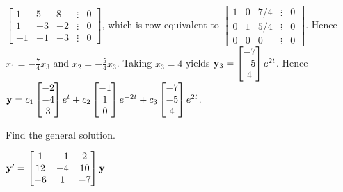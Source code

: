 \documentclass{ximera}
\begin{document}
\begin{problem}
\begin{solution}
$ \begin{bmatrix}1&5&8&\vdots&0\\1&-3
&-2&\vdots&0\\-1&-1&-3&\vdots&0
\end{bmatrix}$,
which is row equivalent to
$ \begin{bmatrix}1&0&7/4&\vdots&0\\0&1&5/4&
\vdots&0\\0&0&0&\vdots&0\end{bmatrix}$.
Hence $x_1=-\frac{7 }{4}x_3$ and $x_2=-\frac{5 }{4}x_3$.  Taking $x_3=4$
yields
${\bf y}_3= \begin{bmatrix}-7\\-5\\4
\end{bmatrix}e^{2t}$. Hence
${\bf y}=  c_1\begin{bmatrix}-2\\-4\\
3\end{bmatrix}e^t+c_2\begin{bmatrix}-1\\1\\0
\end{bmatrix}e^{-2t}+c_3\begin{bmatrix}-7\\-5\\4
\end{bmatrix}e^{2t}$.
\end{solution}
\end{problem}


\begin{problem}\label{exer:10.4.11}
Find the general solution.

$ {\bf y}'=
\begin{bmatrix}
1&-1&2\\12&-4
& 10\\-6&1&-7
\end{bmatrix}{\bf y}$
\end{problem}
\end{document}
